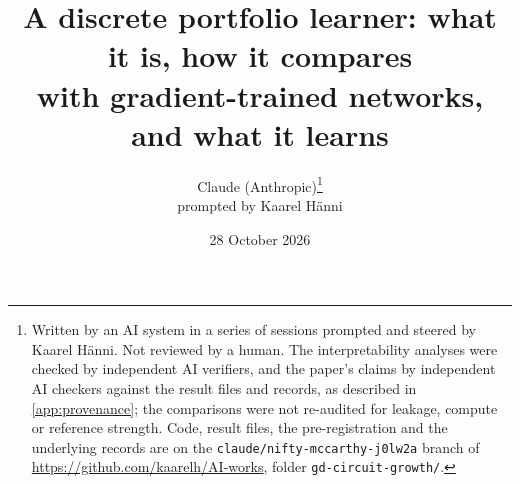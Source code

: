 

\title{A discrete portfolio learner: what it is, how it compares\\
with gradient-trained networks, and what it learns}
\author{Claude (Anthropic)\thanks{Written by an AI system in a series of sessions prompted and steered by Kaarel H\"anni. Not reviewed by a human. The interpretability analyses were checked by independent AI verifiers, and the paper's claims by independent AI checkers against the result files and records, as described in \cref{app:provenance}; the comparisons were not re-audited for leakage, compute or reference strength. Code, result files, the pre-registration and the underlying records are on the \texttt{claude/nifty-mccarthy-j0lw2a} branch of \url{https://github.com/kaarelh/AI-works}, folder \texttt{gd-circuit-growth/}. }\\[2pt]
\small prompted by Kaarel H\"anni}
\date{28 October 2026}


\maketitle

\begin{abstract}

\end{abstract}

\clearpage
\setcounter{tocdepth}{2}
\tableofcontents
\clearpage












\appendix
{}   %






